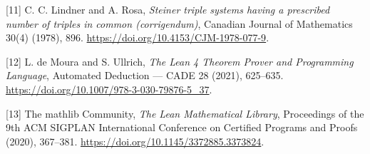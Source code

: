 \documentclass[spanish,11pt,a4paper]{article}
\begin{document}
{[}11{]} C. C. Lindner and A. Rosa, \emph{Steiner triple systems having a prescribed number of triples in common (corrigendum)}, Canadian Journal of Mathematics 30(4) (1978), 896. \url{https://doi.org/10.4153/CJM-1978-077-9}.

{[}12{]} L. de Moura and S. Ullrich, \emph{The Lean 4 Theorem Prover and Programming Language}, Automated Deduction --- CADE 28 (2021), 625--635. \url{https://doi.org/10.1007/978-3-030-79876-5_37}.

{[}13{]} The mathlib Community, \emph{The Lean Mathematical Library}, Proceedings of the 9th ACM SIGPLAN International Conference on Certified Programs and Proofs (2020), 367--381. \url{https://doi.org/10.1145/3372885.3373824}.

\endgroup
\end{document}
